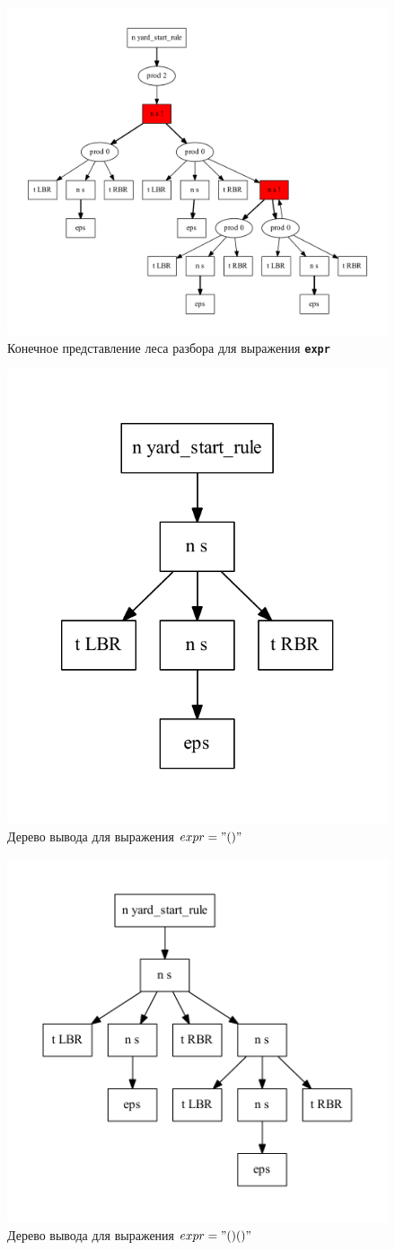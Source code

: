 \begin{figure}[!h]
 \centering
 \includegraphics[width=15cm]{pics/sppf.pdf}
 \caption{Конечное представление леса разбора для выражения \textbf{\texttt{expr}}}
 \label{sppf}
\end{figure}

\begin{figure}[!h]
 \centering
 \includegraphics[width=.4\textwidth]{pics/sppf1.pdf}
 \caption{Дерево вывода для выражения $expr="()"$}
 \label{sppf1}
\end{figure}

\begin{figure}[!h]
 \centering
 \includegraphics[width=.5\textwidth]{pics/sppf2.pdf}
 \caption{Дерево вывода для выражения $expr="()()"$}
 \label{sppf2}
\end{figure}

